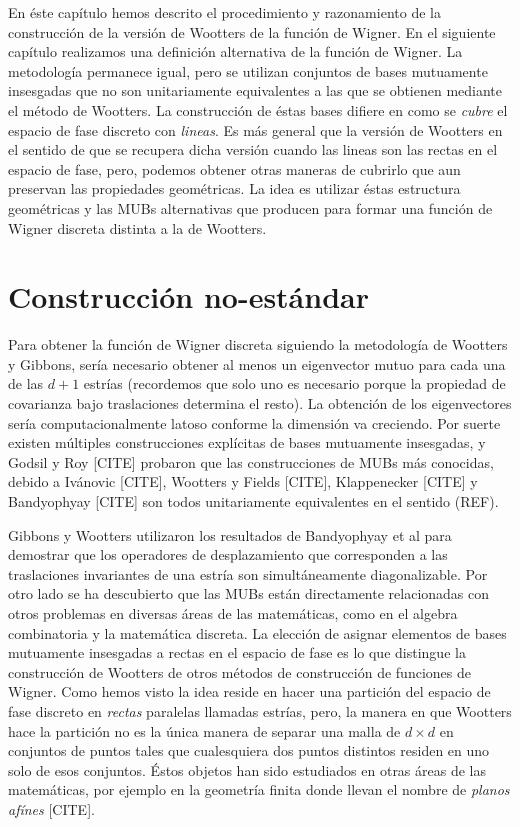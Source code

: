 \documentclass[a4paper]{report}
\begin{document}
  En éste capítulo hemos descrito el procedimiento y
  razonamiento de la construcción de la versión de Wootters
  de la función de Wigner. En el siguiente capítulo
  realizamos una definición alternativa de la función de
  Wigner. La metodología permanece igual, pero se utilizan
  conjuntos de bases mutuamente insesgadas que no son
  unitariamente equivalentes a las que se obtienen mediante
  el método de Wootters. La construcción de éstas bases
  difiere en como se \textit{cubre} el espacio de fase
  discreto con \textit{lineas}. Es más general que la
  versión de Wootters en el sentido de que se recupera dicha
  versión cuando las lineas son las rectas en el espacio de
  fase, pero, podemos obtener otras maneras de cubrirlo que
  aun preservan las propiedades geométricas. La idea es
  utilizar éstas estructura geométricas y las MUBs
  alternativas que producen para formar una función de
  Wigner discreta distinta a la de Wootters.

  \chapter{Construcción no-estándar}

  Para obtener la función de Wigner discreta
  siguiendo la metodología de Wootters y Gibbons, sería
  necesario obtener al menos un eigenvector mutuo para cada
  una de las $d+1$ estrías (recordemos que solo uno es
  necesario porque la propiedad de covarianza bajo
  traslaciones determina el resto). La obtención de los
  eigenvectores sería computacionalmente latoso conforme la
  dimensión va creciendo. Por suerte existen múltiples
  construcciones explícitas de bases mutuamente insesgadas,
  y Godsil y Roy [CITE] probaron que las construcciones de
  MUBs más conocidas, debido a Ivánovic [CITE], Wootters y
  Fields [CITE], Klappenecker [CITE] y Bandyophyay [CITE]
  son todos unitariamente equivalentes en el sentido (REF).

  Gibbons y Wootters utilizaron los resultados de
  Bandyophyay et al para demostrar que los operadores de
  desplazamiento que corresponden a las traslaciones
  invariantes de una estría son simultáneamente
  diagonalizable. Por otro lado se ha descubierto que las
  MUBs están directamente relacionadas con otros problemas
  en diversas áreas de las matemáticas, como en el algebra
  combinatoria y la matemática discreta. La elección de
  asignar elementos de bases mutuamente insesgadas a rectas
  en el espacio de fase es lo que distingue la construcción
  de Wootters de otros métodos de construcción de funciones
  de Wigner. Como hemos visto la idea reside en hacer una
  partición del espacio de fase discreto en \textit{rectas}
  paralelas llamadas estrías, pero, la manera en que
  Wootters hace la partición no es la única manera de
  separar una malla de $d \times d$ en conjuntos de puntos
  tales que cualesquiera dos puntos distintos residen en uno
  solo de esos conjuntos. Éstos objetos han sido estudiados
  en otras áreas de las matemáticas, por ejemplo en la
  geometría finita donde llevan el nombre de \textit{planos
  afínes} [CITE]. 
\end{document}
